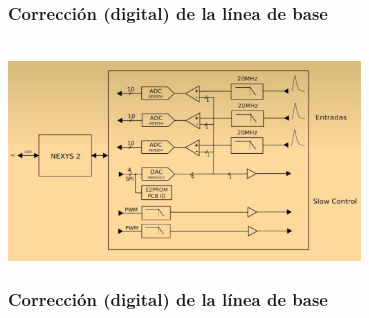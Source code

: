 \documentclass{beamer}
\begin{document}
\begin{frame}
				\frametitle{Corrección (digital) de la línea de base}
  \begin{block}{}
    \centering
					 \\
    \includegraphics[width=0.7\textwidth]{diagrama_en_bloques_lago}
  \end{block}
\end{frame}

\begin{frame}
				\frametitle{Corrección (digital) de la línea de base}
  \begin{block}{}
    \centering
					 \\
  \end{block}
\end{frame}
\end{document}
